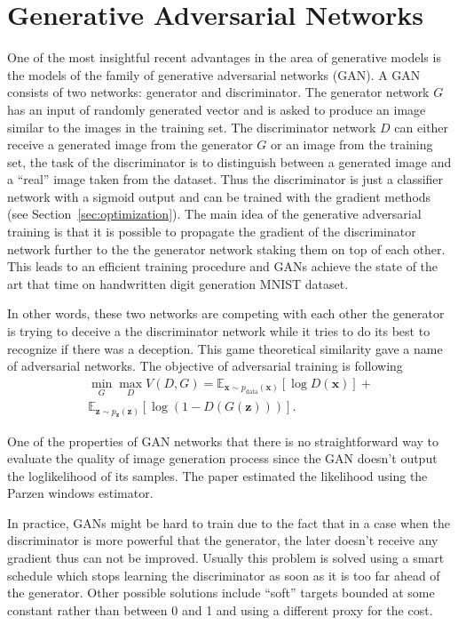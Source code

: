 \documentclass{article}
\begin{document}

\section{Generative Adversarial Networks}
\label{sec:gans}
    One of the most insightful recent advantages in the area of generative models
    is the models of the family of generative adversarial networks (GAN).
    A GAN consists of two networks: generator and discriminator. The generator 
    network $G$ has an
    input of randomly generated vector and is asked to produce an image 
    similar to the images in the training set. The discriminator network $D$
    can either receive a generated image from the generator $G$ or an image
    from the training set, the task of the discriminator is to distinguish
    between a generated image and a ``real'' image taken from the dataset. Thus
    the discriminator is just a classifier network with a sigmoid output
    and can be trained with the gradient methods (see 
    Section~\ref{sec:optimization}). The main idea of the generative adversarial
    training is that it is possible to propagate the gradient of the discriminator
    network further to the the generator network staking them on top of each other.
    This leads to an efficient training procedure and GANs achieve the state of the
    art that time on handwritten digit generation MNIST dataset.

    In other words, these two networks are competing with each other the 
    generator is trying to deceive a the discriminator network while it tries
    to do its best to recognize if there was a deception. This game theoretical
    similarity gave a name of adversarial networks. The objective of adversarial
    training is following
    \begin{align*}
        \min_G \max_D V(D, G) = \mathbb{E}_{\bm{x} \sim p_{\text{data}}(\bm{x})}[\log D(\bm{x})] + \\
          \mathbb{E}_{\bm{z} \sim p_{\bm{z}}(\bm{z})}[\log (1 - D(G(\bm{z})))].
    \end{align*}

    One of the properties of GAN networks that there is no straightforward way 
    to evaluate the quality of image generation process since the GAN doesn't 
    output the loglikelihood of its samples. The paper estimated the likelihood
    using the Parzen windows estimator.

    In practice, GANs might be hard to train due to the fact that in a case when 
    the discriminator is more powerful that the generator, the later doesn't 
    receive any gradient thus can not be improved. Usually this problem is solved
    using a smart schedule which stops learning the discriminator as soon as it
    is too far ahead of the generator. Other possible solutions include ``soft''
    targets bounded at some constant rather than between 0 and 1 and using a 
    different proxy for the cost.
\end{document}

